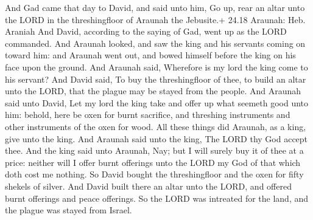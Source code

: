  And Gad came that day to David, and said unto him, Go
up, rear an altar unto the LORD in the threshingfloor of Araunah the
Jebusite.+ 24.18 Araunah: Heb. Araniah  And David,
according to the saying of Gad, went up as the LORD commanded.
 And Araunah looked, and saw the king and his servants
coming on toward him: and Araunah went out, and bowed himself before the
king on his face upon the ground.  And Araunah said,
Wherefore is my lord the king come to his servant? And David said, To
buy the threshingfloor of thee, to build an altar unto the LORD, that
the plague may be stayed from the people.  And Araunah said
unto David, Let my lord the king take and offer up what seemeth good
unto him: behold, here be oxen for burnt sacrifice, and threshing
instruments and other instruments of the oxen for wood. 
All these things did Araunah, as a king, give unto the king. And Araunah
said unto the king, The LORD thy God accept thee.  And the
king said unto Araunah, Nay; but I will surely buy it of thee at a
price: neither will I offer burnt offerings unto the LORD my God of that
which doth cost me nothing. So David bought the threshingfloor and the
oxen for fifty shekels of silver.  And David built there an
altar unto the LORD, and offered burnt offerings and peace offerings. So
the LORD was intreated for the land, and the plague was stayed from
Israel.
